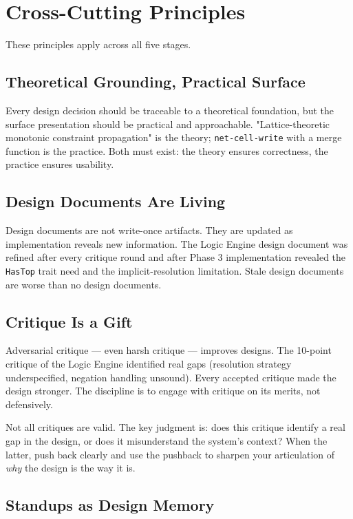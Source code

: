 \documentclass[11pt]{article}
\begin{document}
\section{Cross-Cutting Principles}
\label{sec:org92c4466}

These principles apply across all five stages.
\subsection{Theoretical Grounding, Practical Surface}
\label{sec:org0858d94}

Every design decision should be traceable to a theoretical foundation,
but the surface presentation should be practical and approachable.
"Lattice-theoretic monotonic constraint propagation" is the theory;
\texttt{net-cell-write} with a merge function is the practice. Both must
exist: the theory ensures correctness, the practice ensures usability.
\subsection{Design Documents Are Living}
\label{sec:org639c8d5}

Design documents are not write-once artifacts. They are updated as
implementation reveals new information. The Logic Engine design document
was refined after every critique round and after Phase 3 implementation
revealed the \texttt{HasTop} trait need and the implicit-resolution limitation.
Stale design documents are worse than no design documents.
\subsection{Critique Is a Gift}
\label{sec:org8759102}

Adversarial critique --- even harsh critique --- improves designs. The
10-point critique of the Logic Engine identified real gaps (resolution
strategy underspecified, negation handling unsound). Every accepted
critique made the design stronger. The discipline is to engage with
critique on its merits, not defensively.

Not all critiques are valid. The key judgment is: does this critique
identify a real gap in the design, or does it misunderstand the
system's context? When the latter, push back clearly and use the
pushback to sharpen your articulation of \emph{why} the design is the way
it is.
\subsection{Standups as Design Memory}
\label{sec:orgd4ce6b5}
\end{document}

